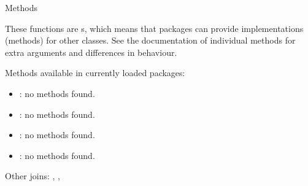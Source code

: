 \documentclass[a4paper]{book}
\begin{document}
\begin{Section}{Methods}

These functions are s, which means that packages can provide
implementations (methods) for other classes. See the documentation of
individual methods for extra arguments and differences in behaviour.

Methods available in currently loaded packages:
\begin{itemize}

\item{} : no methods found.
\item{} : no methods found.
\item{} : no methods found.
\item{} : no methods found.

\end{itemize}

\end{Section}
%
\begin{SeeAlso}
Other joins: 
,
,
\end{SeeAlso}
%
\end{document}
